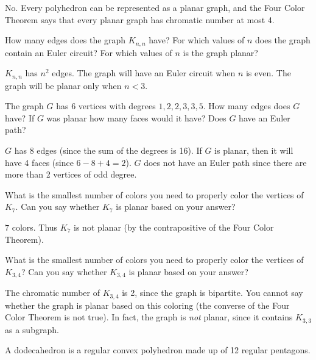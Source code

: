 \begin{questions}
	 \begin{answer}
		 No.  Every polyhedron can be represented as a planar graph, and the Four Color Theorem says that every planar graph has chromatic number at most 4.
	 \end{answer}


 \question How many edges does the graph $K_{n,n}$ have?  For which values of $n$ does the graph contain an Euler circuit?  For which values of $n$ is the graph planar?

  \begin{answer}
  $K_{n,n}$ has $n^2$ edges.  The graph will have an Euler circuit when $n$ is even.  The graph will be planar only when $n < 3$.
  \end{answer}



 \question The graph $G$ has 6 vertices with degrees $1, 2, 2, 3, 3, 5$.  How many edges does $G$ have?  If $G$ was planar how many faces would it have?  Does $G$ have an Euler path?

  \begin{answer}
  $G$ has 8 edges (since the sum of the degrees is 16).  If $G$ is planar, then it will have 4 faces (since $6 - 8 + 4 = 2$).  $G$ does not have an Euler path since there are more than 2 vertices of odd degree.
  \end{answer}



\question What is the smallest number of colors you need to properly color the vertices of $K_{7}$.  Can you say whether $K_7$ is planar based on your answer?

  \begin{answer}
  $7$ colors.  Thus $K_7$ is not planar (by the contrapositive of the Four Color Theorem).
  \end{answer}


\question What is the smallest number of colors you need to properly color the vertices of $K_{3,4}$?  Can you say whether $K_{3,4}$ is planar based on your answer?

  \begin{answer}
  The chromatic number of $K_{3,4}$ is 2, since the graph is bipartite.  You cannot say whether the graph is planar based on this coloring (the converse of the Four Color Theorem is not true).  In fact, the graph is {\em not} planar, since it contains $K_{3,3}$ as a subgraph.
  \end{answer}


\question A dodecahedron is a regular convex polyhedron made up of 12 regular pentagons.
\begin{parts}

\end{parts}
\end{questions}
